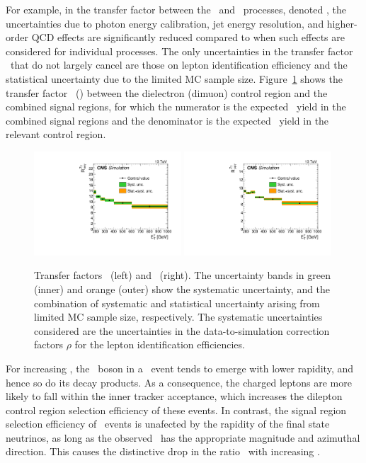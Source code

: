 For example, in the transfer factor between the \zinvg\ and \zllg\ processes, denoted \RZll, the uncertainties due to photon energy calibration, jet energy resolution, and higher-order QCD effects are significantly reduced compared to when such effects are considered for individual processes. 
The only uncertainties in the transfer factor \RZll\ that do not largely cancel are those on lepton identification efficiency and the statistical uncertainty due to the limited MC sample size. 
Figure~\ref{fig:tf_z} shows the transfer factor \RZee\ (\RZmm) between the dielectron (dimuon) control region and the combined signal regions, for which the numerator is the expected \zinvg\ yield in the combined signal regions and the denominator is the expected \zllg\ yield in the relevant control region.

\begin{figure}[htbp]
  \centering
    \includegraphics[width=0.49\textwidth]{Analysis/Figures/RZee.pdf}
    \includegraphics[width=0.49\textwidth]{Analysis/Figures/RZmm.pdf}
    \caption{
      Transfer factors \RZee\ (left) and \RZmm\ (right). 
      The uncertainty bands in green (inner) and orange (outer) show the systematic uncertainty, and the combination of systematic and statistical uncertainty arising from limited MC sample size, respectively. 
      The systematic uncertainties considered are the uncertainties in the data-to-simulation correction factors $\rho$ for the lepton identification efficiencies.
    }
    \label{fig:tf_z}
\end{figure}

For increasing \ETg, the \PZ\ boson in a \zllg\ event tends to emerge with lower rapidity, and hence so do its decay products. 
As a consequence, the charged leptons are more likely to fall within the inner tracker acceptance, which increases the dilepton control region selection efficiency of these events. 
In contrast, the signal region selection efficiency of \zinvg\ events is unafected by the rapidity of the final state neutrinos, as long as the observed \met\ has the appropriate magnitude and azimuthal direction. 
This causes the distinctive drop in the ratio \RZll\ with increasing \ETg.


